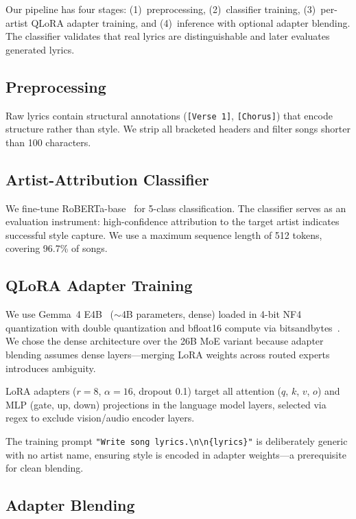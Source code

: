 \documentclass[runningheads]{llncs}
\begin{document}
Our pipeline has four stages: (1)~preprocessing, (2)~classifier training, (3)~per-artist QLoRA adapter training, and (4)~inference with optional adapter blending. The classifier validates that real lyrics are distinguishable and later evaluates generated lyrics.

\subsection{Preprocessing}

Raw lyrics contain structural annotations (\texttt{[Verse~1]}, \texttt{[Chorus]}) that encode structure rather than style. We strip all bracketed headers and filter songs shorter than 100 characters.

\subsection{Artist-Attribution Classifier}

We fine-tune RoBERTa-base~\cite{liu2019roberta} for 5-class classification. The classifier serves as an evaluation instrument: high-confidence attribution to the target artist indicates successful style capture. We use a maximum sequence length of 512 tokens, covering 96.7\% of songs.

\subsection{QLoRA Adapter Training}

We use Gemma~4 E4B~\cite{gemma2025} (${\sim}$4B parameters, dense) loaded in 4-bit NF4 quantization with double quantization and bfloat16 compute via bitsandbytes~\cite{dettmers2022llmint8}. We chose the dense architecture over the 26B MoE variant because adapter blending assumes dense layers---merging LoRA weights across routed experts introduces ambiguity.

LoRA adapters ($r{=}8$, $\alpha{=}16$, dropout 0.1) target all attention ($q$, $k$, $v$, $o$) and MLP (gate, up, down) projections in the language model layers, selected via regex to exclude vision/audio encoder layers.

The training prompt \texttt{"Write song lyrics.\textbackslash n\textbackslash n\{lyrics\}"} is deliberately generic with no artist name, ensuring style is encoded in adapter weights---a prerequisite for clean blending.

\subsection{Adapter Blending}
\end{document}
